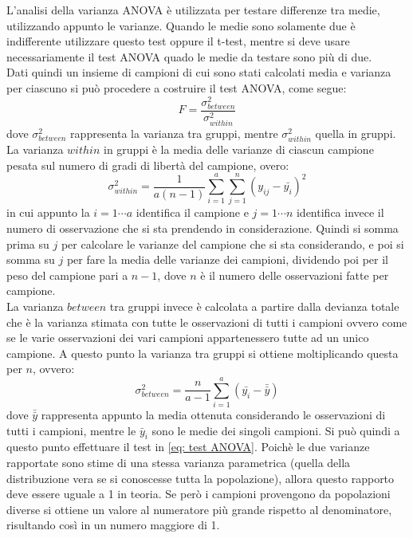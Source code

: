 \begin{tcolorbox}[colback=cyan!5!white, colframe=cyan!75!black, title = ANOVA]
	L'analisi della varianza ANOVA è utilizzata per testare differenze tra medie, utilizzando appunto le varianze. Quando le medie sono solamente due è indifferente utilizzare questo test oppure il t-test, mentre si deve usare necessariamente il test ANOVA quado le medie da testare sono più di due.\\
	Dati quindi un insieme di campioni di cui sono stati calcolati media e varianza per ciascuno si può procedere a costruire il test ANOVA, come segue:
	\begin{equation}
	F = \frac{\sigma^2_{between}}{\sigma^2_{within}}
	\label{eq: test ANOVA}
	\end{equation}
	dove $\sigma^2_{between}$ rappresenta la varianza tra gruppi, mentre $\sigma^2_{within}$ quella in gruppi.\\
	La varianza $within$ in gruppi è la media delle varianze di ciascun campione pesata sul numero di gradi di libertà del campione, overo:
	\begin{equation}
	\sigma^2_{within} = \frac{1}{a(n-1)}\sum_{i=1}^{a}\sum_{j=1}^{n}(y_{ij} - \bar{y_i})^2
	\end{equation}
	in cui appunto la $i = 1 \cdots a$ identifica il campione e $j = 1 \cdots n$ identifica invece il numero di osservazione che si sta prendendo in considerazione. Quindi si somma prima su $j$ per calcolare le varianze del campione che si sta considerando, e poi si somma su $j$ per fare la media delle varianze dei campioni, dividendo poi per il peso del campione pari a $n-1$, dove $n$ è il numero delle osservazioni fatte per campione. \\
	La varianza $between$ tra gruppi invece è calcolata a partire dalla devianza totale che è la varianza stimata con tutte le osservazioni di tutti i campioni ovvero come se le varie osservazioni dei vari campioni appartenessero tutte ad un unico campione. A questo punto la varianza tra gruppi si ottiene moltiplicando questa per $n$, ovvero:
	\begin{equation}
	\sigma^2_{between} = \frac{n}{a-1}\sum_{i=1}^{a} (\bar{y_i} - \bar{\bar{y}})
	\end{equation}
	dove $\bar{\bar{y}}$ rappresenta appunto la media ottenuta considerando le osservazioni di tutti i campioni, mentre le $\bar{y}_i$ sono le medie dei singoli campioni.	
	Si può quindi a questo punto effettuare il test in \eqref{eq: test ANOVA}. Poichè le due varianze rapportate sono stime di una stessa varianza parametrica (quella della distribuzione vera se si conoscesse tutta la popolazione), allora questo rapporto deve essere uguale a 1 in teoria. Se però i campioni provengono da popolazioni diverse si ottiene un valore al numeratore più grande rispetto al denominatore, risultando così in un numero maggiore di 1.\\

\end{tcolorbox}
